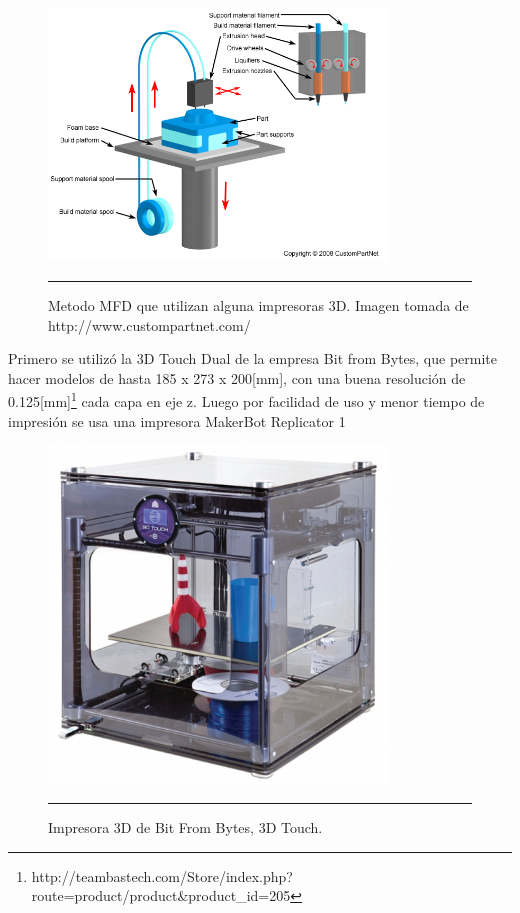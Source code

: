 \begin{figure}[htbp]
	\centering
		\includegraphics[width=0.8\textwidth]{./Figures/fdm.png}
		\rule{35em}{0.5pt}
	\caption[MFD]{Metodo MFD que utilizan alguna impresoras 3D. Imagen tomada de http://www.custompartnet.com/}
	\label{fig:MFD}
\end{figure}

Primero se utilizó la 3D Touch Dual de la empresa Bit from Bytes, que permite hacer modelos de hasta 185 x 273 x 200[mm], con una buena resolución de 0.125[mm]\footnote{http://teambastech.com/Store/index.php?route=product/product\&product\_id=205} cada capa en eje z. Luego por facilidad de uso y menor tiempo de impresión se usa una impresora MakerBot Replicator 1

\begin{figure}[htbp]
	\centering
		\includegraphics[width=0.8\textwidth]{./Figures/3dtouch.jpg}
		\rule{35em}{0.5pt}
	\caption[3DTouch]{Impresora 3D de Bit From Bytes, 3D Touch.}
	\label{fig:3Dtouch}
\end{figure}	


